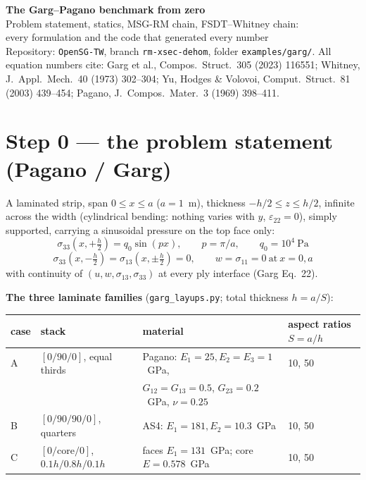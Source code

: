 \documentclass[11pt]{article}
\newcommand{\code}[1]{\texttt{#1}}
\begin{document}
\begin{center}
{\LARGE\bfseries The Garg--Pagano benchmark from zero}\\[4pt]
{\large Problem statement, statics, MSG-RM chain, FSDT--Whitney chain:\\
every formulation and the code that generated every number}\\[4pt]
{\small Repository: \code{OpenSG-TW}, branch \code{rm-xsec-dehom}, folder
\code{examples/garg/}.  All equation numbers cite: Garg et al., Compos.\ Struct.\
305 (2023) 116551; Whitney, J.\ Appl.\ Mech.\ 40 (1973) 302--304; Yu, Hodges \&
Volovoi, Comput.\ Struct.\ 81 (2003) 439--454; Pagano, J.\ Compos.\ Mater.\ 3
(1969) 398--411.}
\end{center}

\section{Step 0 --- the problem statement (Pagano / Garg)}

A laminated strip, span $0 \le x \le a$ ($a = 1$~m), thickness $-h/2 \le z \le h/2$,
infinite across the width (cylindrical bending: nothing varies with $y$, $\varepsilon_{22}=0$),
simply supported, carrying a sinusoidal pressure on the top face only:
\begin{equation}
\sigma_{33}\!\left(x, +\tfrac h2\right) = q_0 \sin(px), \qquad p = \pi/a, \qquad q_0 = 10^4~\text{Pa}
\end{equation}
\begin{equation}
\sigma_{33}\!\left(x,-\tfrac h2\right) = \sigma_{13}\!\left(x,\pm\tfrac h2\right) = 0,
\qquad w = \sigma_{11} = 0 \ \text{at}\ x = 0, a
\tag{Garg Eq.~21}
\end{equation}
with continuity of $(u, w, \sigma_{13}, \sigma_{33})$ at every ply interface (Garg Eq.~22).

\textbf{The three laminate families} (\code{garg\_layups.py}; total thickness $h = a/S$):
\begin{center}\small
\begin{tabular}{llll}
\toprule
case & stack & material & aspect ratios $S=a/h$\\
\midrule
A & $[0/90/0]$, equal thirds & Pagano: $E_1{=}25, E_2{=}E_3{=}1$~GPa, & 10, 50\\
  & & $G_{12}{=}G_{13}{=}0.5$, $G_{23}{=}0.2$~GPa, $\nu{=}0.25$ &\\
B & $[0/90/90/0]$, quarters & AS4: $E_1{=}181, E_2{=}10.3$~GPa & 10, 50\\
C & $[0/\text{core}/0]$, $0.1h/0.8h/0.1h$ & faces $E_1{=}131$~GPa; core $E{=}0.578$~GPa & 10, 50\\
\bottomrule
\end{tabular}
\end{center}
\end{document}
